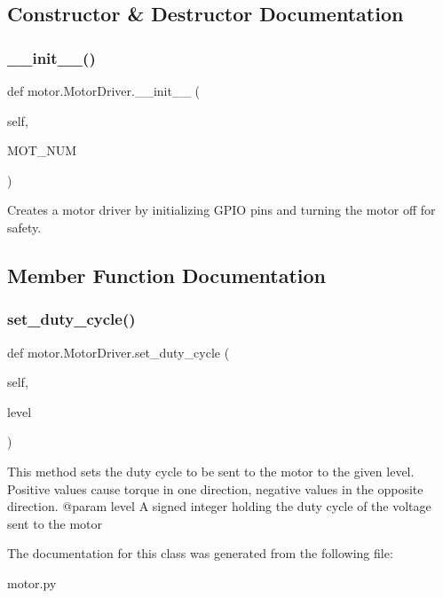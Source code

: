 \subsection{Constructor \& Destructor Documentation}
\mbox{\label{classmotor_1_1_motor_driver_afdb79336d9a01da3225b1ce463a1b86f}} 
\subsubsection{\texorpdfstring{\_\_init\_\_()}{\_\_init\_\_()}}
{\footnotesize\ttfamily def motor.\+Motor\+Driver.\+\_\+\+\_\+init\+\_\+\+\_\+ (\begin{DoxyParamCaption}\item[{}]{self,  }\item[{}]{M\+O\+T\+\_\+\+N\+UM }\end{DoxyParamCaption})}

\begin{DoxyVerb}Creates a motor driver by initializing GPIO
pins and turning the motor off for safety. \end{DoxyVerb}
 

\subsection{Member Function Documentation}
\mbox{\label{classmotor_1_1_motor_driver_a51b4721406aa66e0807413199b8b700f}} 
\subsubsection{\texorpdfstring{set\_duty\_cycle()}{set\_duty\_cycle()}}
{\footnotesize\ttfamily def motor.\+Motor\+Driver.\+set\+\_\+duty\+\_\+cycle (\begin{DoxyParamCaption}\item[{}]{self,  }\item[{}]{level }\end{DoxyParamCaption})}

\begin{DoxyVerb}This method sets the duty cycle to be sent
to the motor to the given level. Positive values
cause torque in one direction, negative values
in the opposite direction.
@param level A signed integer holding the duty
cycle of the voltage sent to the motor \end{DoxyVerb}
 

The documentation for this class was generated from the following file\+:\begin{DoxyCompactItemize}
\item 
motor.\+py\end{DoxyCompactItemize}
